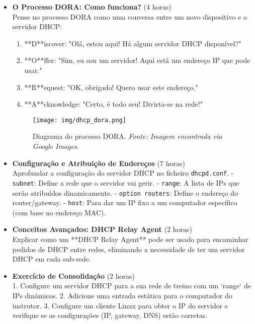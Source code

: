 \documentclass[10pt,a4paper]{article}
\begin{document}
	\begin{itemize}
		\item \textbf{O Processo DORA: Como funciona?} (4 horas) \\
		Pense no processo DORA como uma conversa entre um novo dispositivo e o servidor DHCP:
		\begin{enumerate}
			\item **D**iscover: "Olá, estou aqui! Há algum servidor DHCP disponível?"
			\item **O**ffer: "Sim, eu sou um servidor! Aqui está um endereço IP que pode usar."
			\item **R**equest: "OK, obrigado! Quero usar este endereço."
			\item **A**cknowledge: "Certo, é todo seu! Divirta-se na rede!"
		\end{enumerate}
		
		\begin{figure}[h]
			\centering
			\texttt{[image: img/dhcp\_dora.png]}
			\caption{Diagrama do processo DORA. \textit{Fonte: Imagem encontrada via Google Images.}}
			\label{fig:dhcp_dora}
		\end{figure}
		
		\item \textbf{Configuração e Atribuição de Endereços} (7 horas) \\
		Aprofundar a configuração do servidor DHCP no ficheiro \texttt{dhcpd.conf}.
		- \texttt{subnet}: Define a rede que o servidor vai gerir.
		- \texttt{range}: A lista de IPs que serão atribuídos dinamicamente.
		- \texttt{option routers}: Define o endereço do router/gateway.
		- \texttt{host}: Para dar um IP fixo a um computador específico (com base no endereço MAC).
		
		\item \textbf{Conceitos Avançados: DHCP Relay Agent} (2 horas) \\
		Explicar como um **DHCP Relay Agent** pode ser usado para encaminhar pedidos de DHCP entre redes, eliminando a necessidade de ter um servidor DHCP em cada sub-rede.
		
		\item \textbf{Exercício de Consolidação} (2 horas) \\
		1. Configure um servidor DHCP para a sua rede de treino com um `range` de IPs dinâmicos.
		2. Adicione uma entrada estática para o computador do instrutor.
		3. Configure um cliente Linux para obter o IP do servidor e verifique se as configurações (IP, gateway, DNS) estão corretas.
	\end{itemize}
	
\end{document}
